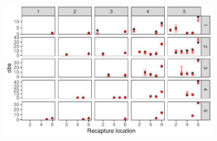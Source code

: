 \documentclass[
  letterpaper,
  DIV=11,
  numbers=noendperiod]{scrartcl}
\begin{document}
\begin{figure}[H]

{\centering \includegraphics{KaleDoc_files/figure-pdf/unnamed-chunk-7-1.pdf}

}

\end{figure}
\end{document}
